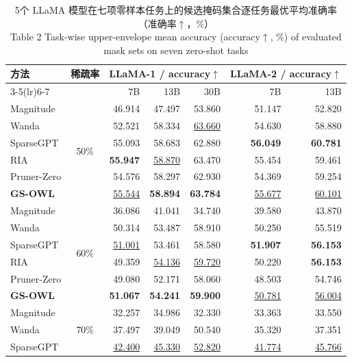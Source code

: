 \documentclass[UTF8,fontset=fandol]{ctexart}
\renewcommand{\arraystretch}{1.08}
\newcommand{\best}[1]{\textbf{#1}}
\newcommand{\second}[1]{\underline{#1}}
\begin{document}
\begin{table}[!htbp]
\centering
\caption{5个 LLaMA 模型在七项零样本任务上的候选掩码集合逐任务最优平均准确率（准确率$\uparrow$，\%）\\
Table 2 Task-wise upper-envelope mean accuracy (accuracy$\uparrow$, \%) of evaluated mask sets on seven zero-shot tasks}
\label{tab:zero}
\scriptsize
\setlength{\tabcolsep}{4.2pt}
\renewcommand{\arraystretch}{0.96}
\begin{tabular*}{0.98\textwidth}{@{\extracolsep{\fill}}lcrrrrr@{}}
\toprule
\multirow{2}{*}{方法} & \multirow{2}{*}{稀疏率} &
\multicolumn{3}{c}{LLaMA-1 / accuracy$\uparrow$} & \multicolumn{2}{c}{LLaMA-2 / accuracy$\uparrow$} \\
\cmidrule(lr){3-5}\cmidrule(lr){6-7}
 & & 7B & 13B & 30B & 7B & 13B \\
\midrule
Magnitude & \multirow{6}{*}{50\%} & 46.914 & 47.497 & 53.860 & 51.147 & 52.820 \\
Wanda & & 52.521 & 58.334 & \second{63.660} & 54.630 & 58.880 \\
SparseGPT & & 55.093 & 58.683 & 62.880 & \best{56.049} & \best{60.781} \\
RIA & & \best{55.947} & \second{58.870} & 63.470 & 55.454 & 59.461 \\
Pruner-Zero & & 54.576 & 58.297 & 62.930 & 54.369 & 59.254 \\
  \textbf{GS-OWL} & & \second{55.544} & \best{58.894} & \best{63.784} & \second{55.677} & \second{60.101} \\
\midrule
Magnitude & \multirow{6}{*}{60\%} & 36.086 & 41.041 & 34.740 & 39.580 & 43.870 \\
Wanda & & 50.314 & 53.487 & 58.910 & 50.250 & 55.519 \\
  SparseGPT & & \second{51.001} & 53.461 & 58.580 & \best{51.907} & \best{56.153} \\
RIA & & 49.359 & \second{54.136} & \second{59.720} & 50.220 & \best{56.153} \\
Pruner-Zero & & 49.080 & 52.171 & 58.060 & 48.503 & 54.746 \\
  \textbf{GS-OWL} & & \best{51.067} & \best{54.241} & \best{59.900} & \second{50.781} & \second{56.004} \\
\midrule
Magnitude & \multirow{6}{*}{70\%} & 32.257 & 34.986 & 32.330 & 33.363 & 33.550 \\
Wanda & & 37.497 & 39.049 & 50.540 & 35.320 & 37.351 \\
SparseGPT & & \second{42.400} & \second{45.330} & \second{52.820} & \second{41.774} & \second{45.766} \\

\end{tabular*}
\end{table}
\end{document}

